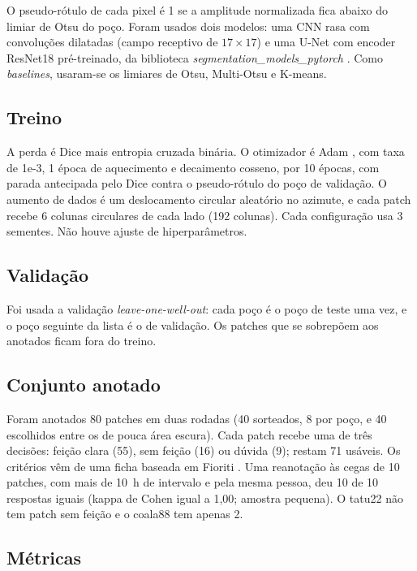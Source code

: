 \documentclass[12pt]{article}
\newif\ifrascunho \rascunhofalse
\newcommand{\fonte}[1]{\ifrascunho\textcolor{blue}{\small(README, #1)}\fi}
\begin{document}
O pseudo-rótulo de cada pixel é 1 se a amplitude normalizada fica abaixo do limiar de Otsu \cite{otsu1979} do poço. Foram usados dois modelos: uma CNN rasa com convoluções dilatadas (campo receptivo de $17 \times 17$) e uma U-Net \cite{ronneberger2015} com encoder ResNet18 \cite{he2016} pré-treinado, da biblioteca \textit{segmentation\_models\_pytorch} \cite{iakubovskii2019}. Como \textit{baselines}, usaram-se os limiares de Otsu, Multi-Otsu e K-means.

\subsection{Treino}

A perda é Dice mais entropia cruzada binária. O otimizador é Adam \cite{kingma2015}, com taxa de 1e-3, 1 época de aquecimento e decaimento cosseno, por 10 épocas, com parada antecipada pelo Dice contra o pseudo-rótulo do poço de validação. O aumento de dados é um deslocamento circular aleatório no azimute, e cada patch recebe 6 colunas circulares de cada lado (192 colunas). Cada configuração usa 3 sementes. Não houve ajuste de hiperparâmetros. \fonte{U13}

\subsection{Validação}

Foi usada a validação \textit{leave-one-well-out}: cada poço é o poço de teste uma vez, e o poço seguinte da lista é o de validação. Os patches que se sobrepõem aos anotados ficam fora do treino.

\subsection{Conjunto anotado}

Foram anotados 80 patches em duas rodadas (40 sorteados, 8 por poço, e 40 escolhidos entre os de pouca área escura). Cada patch recebe uma de três decisões: feição clara (55), sem feição (16) ou dúvida (9); restam 71 usáveis. Os critérios vêm de uma ficha baseada em Fioriti \cite{fioriti2026}. Uma reanotação às cegas de 10 patches, com mais de 10~h de intervalo e pela mesma pessoa, deu 10 de 10 respostas iguais (kappa de Cohen \cite{cohen1960} igual a 1,00; amostra pequena). O tatu22 não tem patch sem feição e o coala88 tem apenas 2. \fonte{itens 53 a 55; U8, U11}

\subsection{Métricas}
\end{document}
